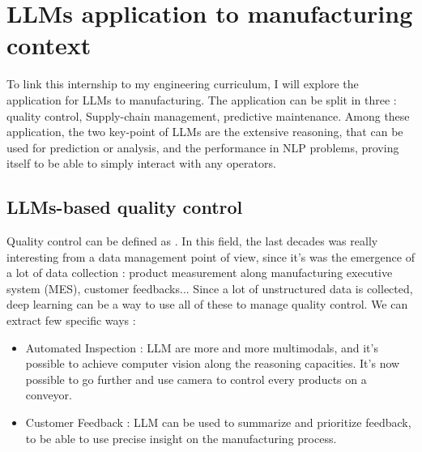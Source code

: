 \section{LLMs application to manufacturing context}
\label{sec:llm_manufacturing}
To link this internship to my engineering curriculum, I will explore the application for LLMs to manufacturing. The application can be split in three : quality control, Supply-chain management, predictive maintenance. Among these application, the two key-point of LLMs are the extensive reasoning, that can be used for prediction or analysis, and the performance in NLP problems, proving itself to be able to simply interact with any operators.

\subsection{LLMs-based quality control}
\label{sec:llm_quality}
Quality control can be defined as  \cite{whatis_QC}. In this field, the last decades was really interesting from a data management point of view, since it's was the emergence of a lot of data collection : product measurement along manufacturing executive system (MES), customer feedbacks... Since a lot of unstructured data is collected, deep learning can be a way to use all of these to manage quality control. We can extract few specific ways : 

\begin{itemize}
    \item Automated Inspection : LLM are more and more multimodals, and it's possible to achieve computer vision along the reasoning capacities. It's now possible to go further and use camera to control every products on a conveyor. 
    \item Customer Feedback : LLM can be used to summarize and prioritize feedback, to be able to use precise insight on the manufacturing process.
\end{itemize}


